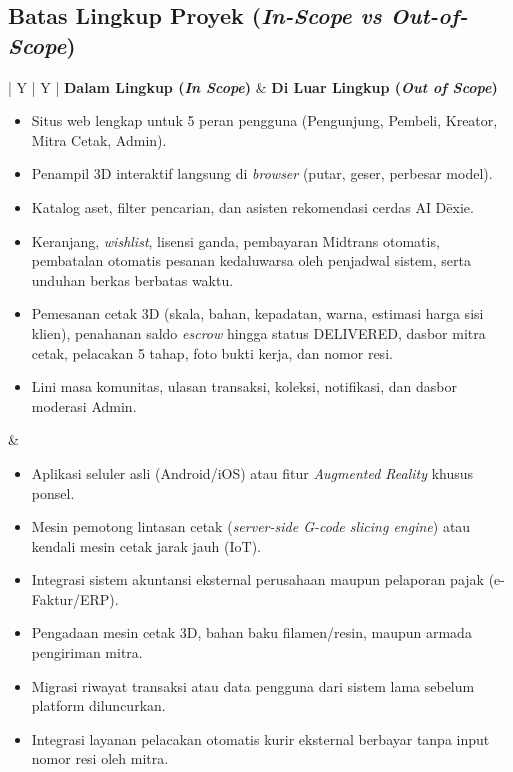 \documentclass[11pt,a4paper]{article}
\newcommand{\thdr}[1]{\centering\arraybackslash\textbf{#1}}
\begin{document}
\clearpage

\subsection{Batas Lingkup Proyek (\textit{In-Scope vs Out-of-Scope})}

\begin{table}[H]
\centering
\caption{Matriks Batas Ruang Lingkup Proyek 3D\={e}x}
\begin{tabularx}{\textwidth}{| Y | Y |}
\hline
{} \thdr{Dalam Lingkup (\textit{In Scope})} & \thdr{Di Luar Lingkup (\textit{Out of Scope})} \\
\hline
\begin{itemize}[leftmargin=1.1em, itemsep=2pt, topsep=2pt]
    \item Situs web lengkap untuk 5 peran pengguna (Pengunjung, Pembeli, Kreator, Mitra Cetak, Admin).
    \item Penampil 3D interaktif langsung di \textit{browser} (putar, geser, perbesar model).
    \item Katalog aset, filter pencarian, dan asisten rekomendasi cerdas AI D\={e}xie.
    \item Keranjang, \textit{wishlist}, lisensi ganda, pembayaran Midtrans otomatis, pembatalan otomatis pesanan kedaluwarsa oleh penjadwal sistem, serta unduhan berkas berbatas waktu.
    \item Pemesanan cetak 3D (skala, bahan, kepadatan, warna, estimasi harga sisi klien), penahanan saldo \textit{escrow} hingga status DELIVERED, dasbor mitra cetak, pelacakan 5 tahap, foto bukti kerja, dan nomor resi.
    \item Lini masa komunitas, ulasan transaksi, koleksi, notifikasi, dan dasbor moderasi Admin.
\end{itemize}
&
\begin{itemize}[leftmargin=1.1em, itemsep=2pt, topsep=2pt]
    \item Aplikasi seluler asli (Android/iOS) atau fitur \textit{Augmented Reality} khusus ponsel.
    \item Mesin pemotong lintasan cetak (\textit{server-side G-code slicing engine}) atau kendali mesin cetak jarak jauh (IoT).
    \item Integrasi sistem akuntansi eksternal perusahaan maupun pelaporan pajak (e-Faktur/ERP).
    \item Pengadaan mesin cetak 3D, bahan baku filamen/resin, maupun armada pengiriman mitra.
    \item Migrasi riwayat transaksi atau data pengguna dari sistem lama sebelum platform diluncurkan.
    \item Integrasi layanan pelacakan otomatis kurir eksternal berbayar tanpa input nomor resi oleh mitra.
\end{itemize} \\
\hline
\end{tabularx}
\end{table}
\end{document}
